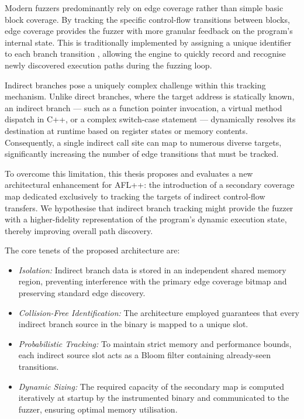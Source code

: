 Modern fuzzers predominantly rely on edge coverage \cite{manes2019art} rather than simple basic block coverage. By tracking the specific control-flow transitions between blocks, edge coverage provides the fuzzer with more granular feedback on the program's internal state. This is traditionally implemented by assigning a unique identifier to each branch transition \cite{zalewski2014afltech}, allowing the engine to quickly record and recognise newly discovered execution paths during the fuzzing loop.

Indirect branches pose a uniquely complex challenge within this tracking mechanism. Unlike direct branches, where the target address is statically known, an indirect branch --- such as a function pointer invocation, a virtual method dispatch in C++, or a complex switch-case statement --- dynamically resolves its destination at runtime based on register states or memory contents. Consequently, a single indirect call site can map to numerous diverse targets, significantly increasing the number of edge transitions that must be tracked.

To overcome this limitation, this thesis proposes and evaluates a new architectural enhancement for AFL++: the introduction of a secondary coverage map dedicated exclusively to tracking the targets of indirect control-flow transfers. We hypothesise that indirect branch tracking might provide the fuzzer with a higher-fidelity representation of the program's dynamic execution state, thereby improving overall path discovery.

The core tenets of the proposed architecture are:
\begin{itemize}
    \item \textit{Isolation:} Indirect branch data is stored in an independent shared memory region, preventing interference with the primary edge coverage bitmap and preserving standard edge discovery.

    \item \textit{Collision-Free Identification:} The architecture employed guarantees that every indirect branch source in the binary is mapped to a unique slot.

    \item \textit{Probabilistic Tracking:} To maintain strict memory and performance bounds, each indirect source slot acts as a Bloom filter containing already-seen transitions. 

    \item \textit{Dynamic Sizing:} The required capacity of the secondary map is computed iteratively at startup by the instrumented binary and communicated to the fuzzer, ensuring optimal memory utilisation.
\end{itemize}


